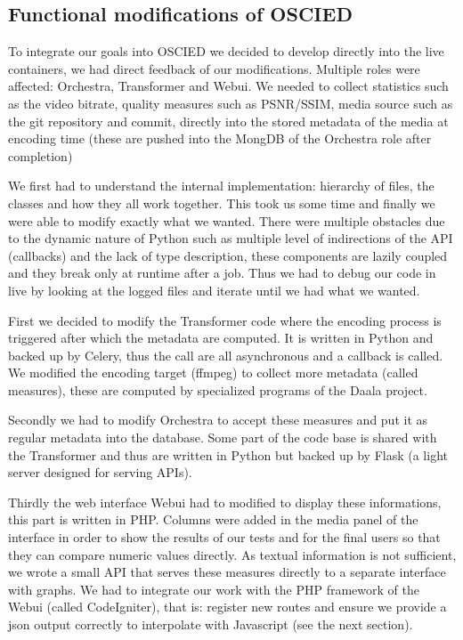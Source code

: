 \documentclass[a4paper,12pt]{article}
\begin{document}

\subsection{Functional modifications of OSCIED}
To integrate our goals into OSCIED we decided to develop directly into the live
containers, we had direct feedback of our modifications.  Multiple roles were
affected: Orchestra, Transformer and Webui.  We needed to collect statistics
such as the video bitrate, quality measures such as PSNR/SSIM, media source such
as the git repository and commit, directly into the stored metadata of the media
at encoding time (these are pushed into the MongDB of the Orchestra role after
completion)

We first had to understand the internal implementation: hierarchy of files, the
classes and how they all work together.  This took us some time and finally we
were able to modify exactly what we wanted.  There were multiple obstacles due
to the dynamic nature of Python such as multiple level of indirections of the
API (callbacks) and the lack of type description, these components are lazily
coupled and they break only at runtime after a job.  Thus we had to debug our
code in live by looking at the logged files and iterate until we had what we
wanted.

First we decided to modify the Transformer code where the encoding process is
triggered after which the metadata are computed.  It is written in Python and
backed up by Celery, thus the call are all asynchronous and a callback is
called.  We modified the encoding target (ffmpeg) to collect more metadata
(called measures), these are computed by specialized programs of the Daala
project.

Secondly we had to modify Orchestra to accept these measures and put it as
regular metadata into the database. Some part of the code base is shared with
the Transformer and thus are written in Python but backed up by Flask (a light
server designed for serving APIs).

Thirdly the web interface Webui had to modified to display these informations,
this part is written in PHP.  Columns were added in the media panel of the
interface in order to show the results of our tests and for the final users
so that they can compare numeric values directly.  As textual information is not
sufficient, we wrote a small API that serves these measures directly to a
separate interface with graphs.  We had to integrate our work with the PHP
framework of the Webui (called CodeIgniter), that is: register new routes and
ensure we provide a json output correctly to interpolate with Javascript (see
the next section).
\end{document}
